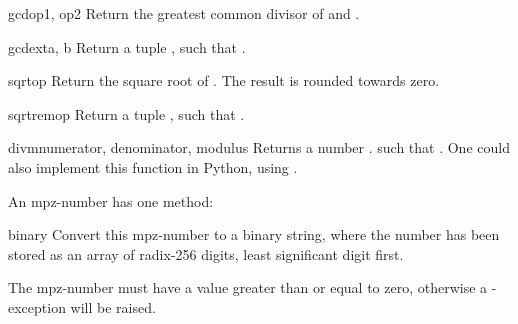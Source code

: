 \begin{funcdesc}{gcd}{op1, op2}
  Return the greatest common divisor of  and .
\end{funcdesc}

\begin{funcdesc}{gcdext}{a, b}
  Return a tuple , such that
  .
\end{funcdesc}

\begin{funcdesc}{sqrt}{op}
  Return the square root of . The result is rounded towards zero.
\end{funcdesc}

\begin{funcdesc}{sqrtrem}{op}
  Return a tuple , such that
  .
\end{funcdesc}

\begin{funcdesc}{divm}{numerator, denominator, modulus}
  Returns a number . such that
  .
  One could also implement this function in Python, using .
\end{funcdesc}

An mpz-number has one method:

\begin{funcdesc}{binary}{}
  Convert this mpz-number to a binary string, where the number has been
  stored as an array of radix-256 digits, least significant digit first.

  The mpz-number must have a value greater than or equal to zero,
  otherwise a -exception will be raised.
\end{funcdesc}
